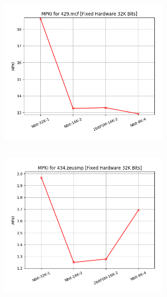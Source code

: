    \begin{minipage}{\textwidth}
      \begin{center}
         \\
         \vspace{3mm}
         \includegraphics[width=0.65\textwidth, frame]{./graphs/4-2ii/429-mcf.png}
         \vspace{6mm}
      \end{center}
   \end{minipage}

   \begin{minipage}{\textwidth}
      \begin{center}
         \\
         \vspace{3mm}
         \includegraphics[width=0.65\textwidth, frame]{./graphs/4-2ii/434-zeusmp.png}
         \vspace{6mm}
      \end{center}
   \end{minipage}

